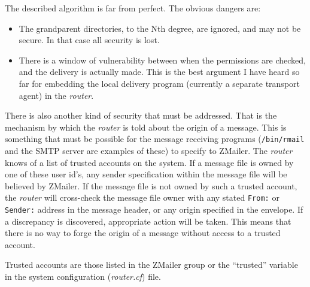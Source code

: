 The described algorithm is far from perfect. The obvious dangers are:
\begin{itemize}\sloppy
\item The grandparent directories, to the Nth degree, are ignored, and may
not be secure. In that case all security is lost.
\item There is a window of vulnerability between when the permissions are
checked, and the delivery is actually made. This is the best argument
I have heard so far for embedding the local delivery program
(currently a separate transport agent) in the {\em router}.
\end{itemize}


There is also another kind of security that must be addressed.  That is the
mechanism by which the {\em router} is told about the origin of a message.  This
is something that must be possible for the message receiving programs
({\tt /bin/rmail} and the SMTP server are examples of these) to specify to
ZMailer. The {\em router} knows of a list of trusted accounts on the system.
If a message file is owned by one of these user id's, any sender specification
within the message file will be believed by ZMailer.  If the message file
is not owned by such a trusted account, the {\em router} will cross-check the
message file owner with any stated {\tt From:} or {\tt Sender:} address 
in the message header, or any origin specified in the envelope.  If a 
discrepancy is discovered, appropriate action will be taken.  This means 
that there is no way to forge the origin of a message without access to a 
trusted account.

Trusted accounts are those listed in the ZMailer group or the ``trusted'' 
variable in the system configuration ({\em router.cf}) file.

